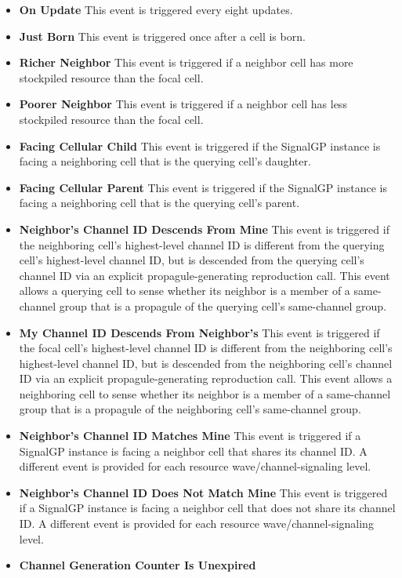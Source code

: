 \begin{itemize}
\item \textbf{On Update}
This event is triggered every eight updates.
\item \textbf{Just Born}
This event is triggered once after a cell is born.
\item \textbf{Richer Neighbor}
This event is triggered if a neighbor cell has more stockpiled resource than the focal cell.
\item \textbf{Poorer Neighbor}
This event is triggered if a neighbor cell has less stockpiled resource than the focal cell.
\item \textbf{Facing Cellular Child}
This event is triggered if the SignalGP instance is facing a neighboring cell that is the querying cell's daughter.
\item \textbf{Facing Cellular Parent}
This event is triggered if the SignalGP instance is facing a neighboring cell that is the querying cell's parent.
\item \textbf{Neighbor's Channel ID Descends From Mine}
This event is triggered if the neighboring cell's highest-level channel ID is different from the querying cell's highest-level channel ID, but is descended from the querying cell's channel ID via an explicit propagule-generating reproduction call.
This event allows a querying cell to sense whether its neighbor is a member of a same-channel group that is a propagule of the querying cell's same-channel group.
\item \textbf{My Channel ID Descends From Neighbor's}
This event is triggered if the focal cell's highest-level channel ID is different from the neighboring cell's highest-level channel ID, but is descended from the neighboring cell's channel ID via an explicit propagule-generating reproduction call.
This event allows a neighboring cell to sense whether its neighbor is a member of a same-channel group that is a propagule of the neighboring cell's same-channel group.
\item \textbf{Neighbor's Channel ID Matches Mine}
This event is triggered if a SignalGP instance is facing a neighbor cell that shares its channel ID.
A different event is provided for each resource wave/channel-signaling level.
\item \textbf{Neighbor's Channel ID Does Not Match Mine}
This event is triggered if a SignalGP instance is facing a neighbor cell that does not share its channel ID.
A different event is provided for each resource wave/channel-signaling level.
\item \textbf{Channel Generation Counter Is Unexpired}

\end{itemize}
